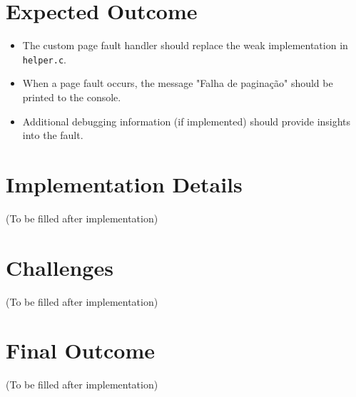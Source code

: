 \documentclass[a4paper,12pt]{report}
\begin{document}
\section{Expected Outcome}
\begin{itemize}
    \item The custom page fault handler should replace the weak implementation in \texttt{helper.c}.
    \item When a page fault occurs, the message "Falha de paginação" should be printed to the console.
    \item Additional debugging information (if implemented) should provide insights into the fault.
\end{itemize}

\section{Implementation Details}
(To be filled after implementation)

\section{Challenges}
(To be filled after implementation)

\section{Final Outcome}
(To be filled after implementation)
\end{document}

